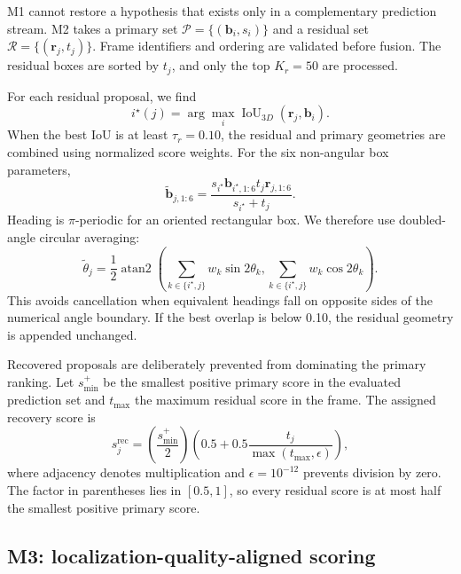 \documentclass[final,5p,times]{elsarticle}
\begin{document}
M1 cannot restore a hypothesis that exists only in a complementary prediction
stream. M2 takes a primary set
$\mathcal{P}=\{(\mathbf{b}_i,s_i)\}$ and a residual set
$\mathcal{R}=\{(\mathbf{r}_j,t_j)\}$. Frame identifiers and ordering are
validated before fusion. The residual boxes are sorted by $t_j$, and only the
top $K_r=50$ are processed.

For each residual proposal, we find
\begin{equation}
i^\star(j)=\arg\max_i
\operatorname{IoU}_{3D}(\mathbf{r}_j,\mathbf{b}_i).
\end{equation}
When the best IoU is at least $\tau_r=0.10$, the residual and primary
geometries are combined using normalized score weights. For the six
non-angular box parameters,
\begin{equation}
\widetilde{\mathbf{b}}_{j,1:6} =
\frac{s_{i^\star}\mathbf{b}_{i^\star,1:6}
 t_j\mathbf{r}_{j,1:6}}
{s_{i^\star}+t_j}.
\end{equation}
Heading is $\pi$-periodic for an oriented rectangular box. We therefore use
doubled-angle circular averaging:
\begin{equation}
\widetilde{\theta}_j=\frac{1}{2}\operatorname{atan2}
\left(
\sum_{k\in\{i^\star,j\}}w_k\sin 2\theta_k,
\sum_{k\in\{i^\star,j\}}w_k\cos 2\theta_k
\right).
\end{equation}
This avoids cancellation when equivalent headings fall on opposite sides of
the numerical angle boundary. If the best overlap is below 0.10, the residual
geometry is appended unchanged.

Recovered proposals are deliberately prevented from dominating the primary
ranking. Let $s_{\min}^{+}$ be the smallest positive primary score in the
evaluated prediction set and $t_{\max}$ the maximum residual score in the
frame. The assigned recovery score is
\begin{equation}
s_j^{\mathrm{rec}} =
\left(\frac{s_{\min}^{+}}{2}\right)
\left(0.5+0.5\frac{t_j}{\max(t_{\max},\epsilon)}\right),
\label{eq:recovery-score}
\end{equation}
where adjacency denotes multiplication and $\epsilon=10^{-12}$ prevents
division by zero. The factor in parentheses lies in $[0.5,1]$, so every
residual score is at most half the smallest positive primary score.

\subsection{M3: localization-quality-aligned scoring}
\end{document}
